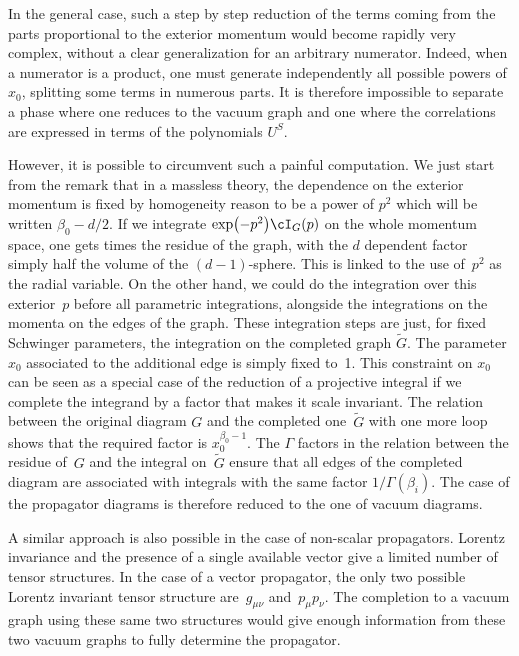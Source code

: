 In the general case, such a step by step reduction of the terms coming from the parts proportional to the
exterior momentum would become rapidly very complex, without a clear generalization for an arbitrary
numerator. Indeed, when a numerator is a product, one must generate independently all possible powers of
$x_0$, splitting some terms in numerous parts. It is therefore impossible to separate a phase where one
reduces to the vacuum graph and one where the correlations are expressed in terms of the polynomials $U^S$.

However, it is possible to circumvent such a painful computation. We just start from the remark that
in a massless theory, the dependence on the exterior momentum is fixed by homogeneity reason to be a
power of $p^2$ which will be written $\beta_0 - d/2$. If we integrate $\exp\bigl(-p^2\bigr) \cI_G(p)$ on the
whole momentum space, one gets  times the residue of the
graph, with the $d$ dependent factor simply half the volume of the $(d-1)$-sphere. This is linked to the use of~$p^2$ as the radial variable.
On the other hand, we could do the integration over this exterior~$p$ before all parametric
integrations, alongside the integrations on the momenta on the edges of the graph. These integration steps are just, for fixed Schwinger
parameters, the integration on the
completed graph $\tilde G$.
The parameter $x_0$ associated to the additional edge is simply fixed to~1. This constraint on $x_0$ can be
seen as a special case of the reduction of a projective integral if we complete the integrand
by a factor that makes it scale invariant. The relation between the original diagram $G$ and the completed one~$\tilde
G$ with one more loop shows that the required factor is $x_0^{\beta_0-1}$. The $\Gamma$ factors in the relation
between the residue of~$G$ and the integral on~$\tilde G$ ensure that all edges of the completed diagram are associated
with integrals with the same factor $1/\Gamma(\beta_i)$. The case of the propagator
diagrams is therefore reduced to the one of vacuum diagrams.

A similar approach is also possible in the case of non-scalar propagators. Lorentz invariance and
the presence of a single available vector give a limited number of tensor structures. In the case of a vector propagator, the only two possible
Lorentz invariant tensor structure are~$g_{\mu\nu}$ and~$p_\mu p_\nu$. The completion to a vacuum graph using these same two structures
would give enough information from these two vacuum graphs to fully determine the propagator.

